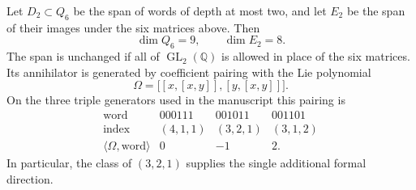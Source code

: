 \begin{theorem}
\label{depthnew:thm:codimension}
Let $D_2\subset Q_6$ be the span of words of depth at most two, and
let $E_2$ be the span of their images under the six matrices above. Then
\[
 \dim Q_6=9,\qquad \dim E_2=8.
\]
The span is unchanged if all of $\operatorname{GL}_2(\mathbb Q)$ is
allowed in place of the six matrices. Its annihilator is generated by
coefficient pairing with the Lie polynomial
\begin{equation}\label{depthnew:eq:omega}
 \Omega=\bigl[[x,[x,y]],[y,[x,y]]\bigr].
\end{equation}
On the three triple generators used in the manuscript this pairing is
\begin{equation}\label{depthnew:eq:triple-values}
\begin{array}{c|ccc}
\text{word}&000111&001011&001101\\
\text{index}&(4,1,1)&(3,2,1)&(3,1,2)\\ \hline
\langle\Omega,\text{word}\rangle&0&-1&2.
\end{array}
\end{equation}
In particular, the class of $(3,2,1)$ supplies the single additional
formal direction.
\end{theorem}

